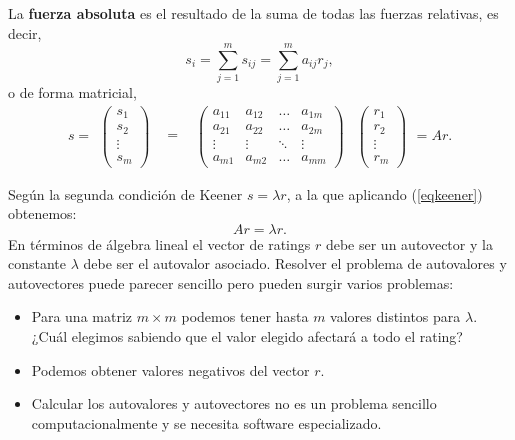 \begin{defi} 
	La \textbf{fuerza absoluta} es el resultado de la suma de todas las fuerzas relativas, es decir,
	\begin{equation}
		s_{i}=\sum_{j=1}^{m} s_{ij} = \sum_{j=1}^{m} a_{ij}r_{j}, 
	\end{equation}
	o de forma matricial,
	\begin{equation}
		s=
		\begin{array}{ccccccc}
			\left(\begin{array}{c}
				s_{1}\\
				s_{2}\\
				\vdots\\
				s_{m}	
			\end{array}\right) & \begin{array}{c}
			=
		\end{array} & \left(\begin{array}{cccc}
		a_{11} & a_{12} & \dots & a_{1m}\\
		a_{21} & a_{22} & \dots & a_{2m} \\
		\vdots & \vdots & \ddots & \vdots\\
		a_{m1} & a_{m2} & \dots & a_{mm}
	\end{array} \right) & \left(\begin{array}{c}
	r_{1}\\
	r_{2}\\
	\vdots\\
	r_{m}
	\end{array} \right) 
	\end{array}  
	=Ar. \label{eqkeener}
	\end{equation} 
\end{defi}

Según la segunda condición de Keener $s= \lambda r$, a la que aplicando (\ref{eqkeener}) obtenemos:
\begin{equation} \label{eqkeener2}
Ar= \lambda r.
\end{equation}
En términos de álgebra lineal el vector de ratings $r$ debe ser un autovector y la constante $\lambda$ debe ser el autovalor asociado. Resolver el problema de autovalores y autovectores puede parecer sencillo pero pueden surgir varios problemas:
\begin{itemize}
	\item Para una matriz $m\times m$ podemos tener hasta $m$ valores distintos para $\lambda$. ¿Cuál elegimos sabiendo que el valor elegido afectará a todo el rating?
	\item Podemos obtener valores negativos del vector $r$.
	\item Calcular los autovalores y autovectores no es un problema sencillo computacionalmente y se necesita software especializado.
\end{itemize}

